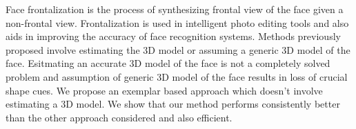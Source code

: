 Face frontalization is the process of synthesizing frontal view of the face given a non-frontal view. 
Frontalization is used in intelligent photo editing tools and also aids in improving the accuracy of face
 recognition systems. Methods previously proposed involve estimating the 3D model or assuming a generic
3D model of the face. Esitmating an accurate 3D model of the face is not a completely solved problem and 
assumption of generic 3D model of the face results in loss of crucial shape cues. We propose an exemplar
based approach which doesn't involve estimating a 3D model. We show that our method performs consistently
better than the other approach considered and also efficient.

